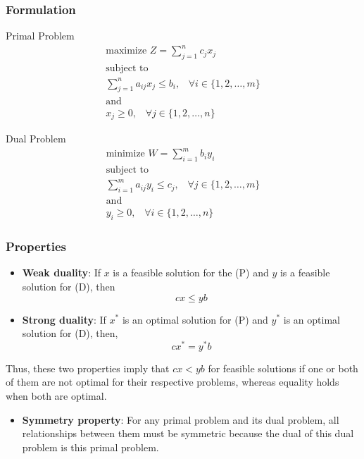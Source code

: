 \subsubsection{Formulation}
\setlength{\columnseprule}{1pt}
\begin{multicols}{2}
    Primal Problem \begin{multline} 
        \text{maximize } Z = \sum_{j=1}^n c_jx_j \\
        \text{subject to }\\
        \sum_{j=1}^n a_{ij}x_j \leq b_i, \;\;\; \forall i \in \{1,2,\dots,m\}\\
        \text{and}\\
        x_j \geq 0, \;\;\; \forall j \in \{1,2,\dots,n\}
    \end{multline}

    Dual Problem \begin{multline}
        \text{minimize } W = \sum_{i=1}^m b_iy_i \\
        \text{subject to }\\
        \sum_{i=1}^m a_{ij}y_i \leq c_j, \;\;\; \forall j \in \{1,2,\dots,m\}\\
        \text{and}\\
        y_i \geq 0, \;\;\; \forall i \in \{1,2,\dots,n\}
    \end{multline}
\end{multicols}

\subsubsection{Properties}
\begin{itemize}
    \item \textbf{Weak duality}: If $x$ is a feasible solution for the (P) and $y$ is a feasible solution for (D), then
    \[ cx \leq yb \]
    \item \textbf{Strong duality}: If $x^*$ is an optimal solution for (P) and $y^*$ is an optimal solution for (D), then,
    \[ cx^* = y^*b \]
\end{itemize}
Thus, these two properties imply that $cx < yb$ for feasible solutions if one or both of them
are not optimal for their respective problems, whereas equality holds when both are optimal.

\begin{itemize}
    \item \textbf{Symmetry property}: For any primal problem and its dual problem, all relationships between them must be 
    symmetric because the dual of this dual problem is this primal problem.
\end{itemize}

